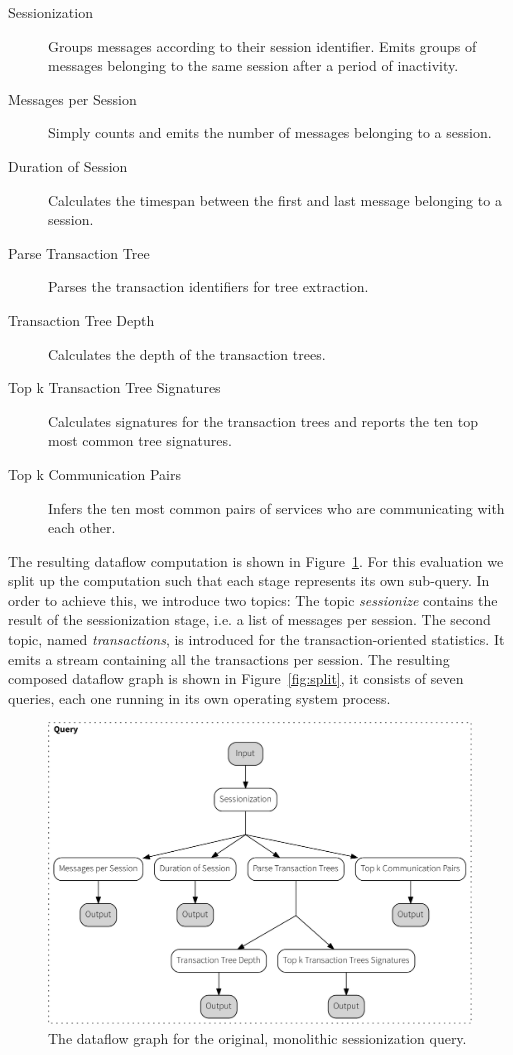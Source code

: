 \begin{description}
\item [Sessionization] Groups messages according to their session identifier.
Emits groups of messages belonging to the same session after a period of inactivity.
\item [Messages per Session] Simply counts and emits the number of messages belonging to a session.
\item [Duration of Session] Calculates the timespan between the first and last message belonging
to a session.
\item [Parse Transaction Tree] Parses the transaction identifiers for tree extraction.
\item [Transaction Tree Depth] Calculates the depth of the transaction trees.
\item [Top k Transaction Tree Signatures] Calculates signatures for the transaction trees and
reports the ten top most common tree signatures.
\item [Top k Communication Pairs] Infers the ten most common pairs of services who are
communicating with each other.
\end{description}

The resulting dataflow computation is shown in Figure~\ref{fig:monolith}. For
this evaluation we split up the computation such that each stage represents
its own sub-query. In order to achieve this, we introduce two topics: The topic
\emph{sessionize} contains the result of the sessionization stage, i.e. 
a list of messages per session. The second topic, named \emph{transactions},
is introduced for the transaction-oriented statistics. It emits a stream
containing all the transactions per session. The resulting composed dataflow
graph is shown in Figure~\ref{fig:split}, it consists of seven queries, each
one running in its own operating system process.

\begin{figure}[p]
  \centering
    \includegraphics[width=1\textwidth]{figures/sessionize_dataflow-crop}
  \caption[Dataflow graph for monolithic sessionization]{The dataflow graph
  for the original, monolithic sessionization query.}
  \label{fig:monolith}
\end{figure}

